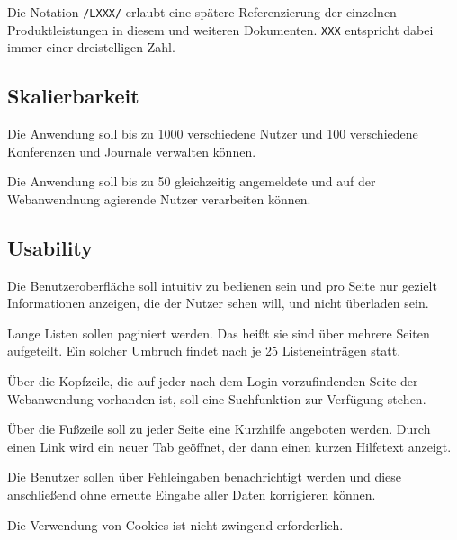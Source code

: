 
Die Notation \texttt{/LXXX/} erlaubt eine spätere Referenzierung der einzelnen Produktleistungen in diesem und weiteren
Dokumenten. \texttt{XXX} entspricht dabei immer einer dreistelligen Zahl.

\subsection{Skalierbarkeit}

\begin{description}

	 Die Anwendung soll bis zu 1000 verschiedene Nutzer und 100 verschiedene Konferenzen und Journale verwalten können.

	 Die Anwendung soll bis zu 50 gleichzeitig angemeldete und auf der Webanwendnung agierende Nutzer verarbeiten können.

\end{description}

\subsection{Usability}

\begin{description}
	 Die Benutzeroberfläche soll intuitiv zu bedienen sein und pro Seite nur gezielt Informationen anzeigen, die der Nutzer sehen will, und nicht überladen sein.

	 Lange Listen sollen paginiert werden. Das heißt sie sind über mehrere Seiten aufgeteilt. Ein solcher Umbruch findet nach je 25 Listeneinträgen statt.

	 Über die Kopfzeile, die auf jeder nach dem Login vorzufindenden Seite der Webanwendung
	vorhanden ist, soll eine Suchfunktion zur Verfügung stehen.

	 Über die Fußzeile soll zu jeder Seite eine Kurzhilfe angeboten werden. Durch einen Link wird ein neuer Tab geöffnet, der dann einen kurzen Hilfetext anzeigt.

	 Die Benutzer sollen über Fehleingaben benachrichtigt werden und diese anschließend ohne erneute Eingabe aller Daten korrigieren können.

	 Die Verwendung von Cookies ist nicht zwingend erforderlich.
\end{description}


